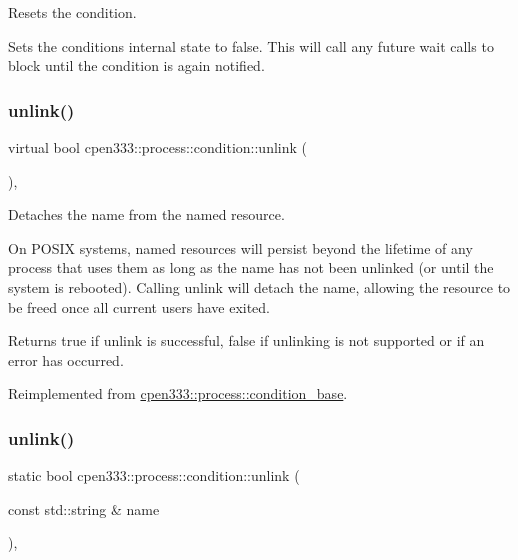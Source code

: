 Resets the condition. 

Sets the condition\textquotesingle{}s internal state to {\ttfamily false}. This will call any future {\ttfamily wait} calls to block until the condition is again notified. \mbox{\label{classcpen333_1_1process_1_1condition_a7c646204b2c4912185ba6055c9afa3f6}} 
\subsubsection{\texorpdfstring{unlink()}{unlink()}\hspace{0.1cm}{\footnotesize\ttfamily [1/2]}}
{\footnotesize\ttfamily virtual bool cpen333\+::process\+::condition\+::unlink (\begin{DoxyParamCaption}{ }\end{DoxyParamCaption})\hspace{0.3cm}{\ttfamily [inline]}, {\ttfamily [virtual]}}



Detaches the name from the named resource. 

On P\+O\+S\+IX systems, named resources will persist beyond the lifetime of any process that uses them as long as the name has not been unlinked (or until the system is rebooted). Calling {\ttfamily unlink} will detach the name, allowing the resource to be freed once all current users have exited.

\begin{DoxyReturn}{Returns}
{\ttfamily true} if unlink is successful, {\ttfamily false} if unlinking is not supported or if an error has occurred. 
\end{DoxyReturn}


Reimplemented from \hyperlink{classcpen333_1_1process_1_1condition__base_acd6d0b53a828aa161ccad06885eaa15c}{cpen333\+::process\+::condition\+\_\+base}.

\mbox{\label{classcpen333_1_1process_1_1condition_aaffc8df542fb4e2aecdc1056217a4284}} 
\subsubsection{\texorpdfstring{unlink()}{unlink()}\hspace{0.1cm}{\footnotesize\ttfamily [2/2]}}
{\footnotesize\ttfamily static bool cpen333\+::process\+::condition\+::unlink (\begin{DoxyParamCaption}\item[{const std\+::string \&}]{name }\end{DoxyParamCaption})\hspace{0.3cm}{\ttfamily [inline]}, {\ttfamily [static]}}



